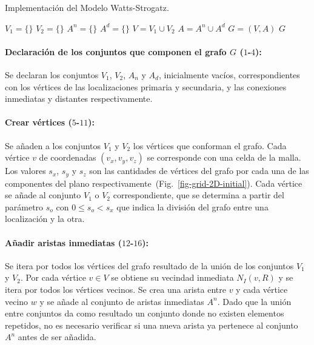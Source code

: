 \begin{algorithm}[!ht]
\caption{Implementaci\'on del Modelo Watts-Strogatz.} \label{alg-watts}
$V_1=\lbrace \rbrace$\;
$V_2=\lbrace \rbrace$\;
$A^n=\lbrace \rbrace$\;
$A^d=\lbrace \rbrace$\;
$V=V_1 \cup V_2$\;
$A=A^n \cup A^d$\;
$G=(V,A)$\;
\Return $G$\;
\end{algorithm}

\paragraph{Declaraci\'on de los conjuntos que componen el grafo $G$ ($1$-$4$):} Se declaran los conjuntos $V_1$, $V_2$, $A_n$ y $A_d$, inicialmente vac\'ios, correspondientes con los v\'ertices de las localizaciones primaria y secundaria, y las conexiones inmediatas y distantes respectivamente. 

\paragraph{Crear v\'ertices ($5$-$11$):} Se a\~naden a los conjuntos $V_1$ y $V_2$ los v\'ertices que conforman el grafo. Cada v\'ertice $v$ de coordenadas $(v_x,v_y, v_z)$ se corresponde con una celda de la malla. Los valores $s_x$, $s_y$ y $s_z$ son las cantidades de v\'ertices del grafo por cada una de las componentes del plano respectivamente~(Fig.~\ref{fig-grid-2D-initial}). Cada v\'ertice se a\~nade al conjunto $V_1$ o $V_2$ correspondiente, que se determina a partir del par\'ametro $s_o$ con $0 \leq s_o < s_x$ que indica la divisi\'on del grafo entre una localizaci\'on y la otra. 

\paragraph{A\~nadir aristas inmediatas ($12$-$16$):} Se itera por todos los v\'ertices del grafo resultado de la uni\'on de los conjuntos $V_1$ y $V_2$. Por cada v\'ertice $v \in V$ se obtiene su vecindad inmediata $N_I(v,R)$ y se itera por todos los v\'ertices vecinos. Se crea una arista entre $v$ y cada v\'ertice vecino $w$ y se a\~nade al conjunto de aristas inmediatas $A^n$. Dado que la uni\'on entre conjuntos da como resultado un conjunto donde no existen elementos repetidos, no es necesario verificar si una nueva arista ya pertenece al conjunto $A^n$ antes de ser a\~nadida.

